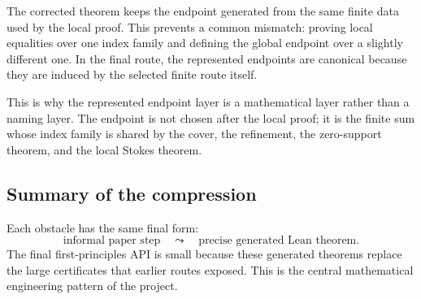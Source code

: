 The corrected theorem keeps the endpoint generated from the same finite data
used by the local proof.  This prevents a common mismatch: proving local
equalities over one index family and defining the global endpoint over a
slightly different one.  In the final route, the represented endpoints are
canonical because they are induced by the selected finite route itself.

This is why the represented endpoint layer is a mathematical layer rather
than a naming layer.  The endpoint is not chosen after the local proof; it is
the finite sum whose index family is shared by the cover, the refinement, the
zero-support theorem, and the local Stokes theorem.

\subsection{Summary of the compression}

Each obstacle has the same final form:
\[
  \text{informal paper step}
  \quad\leadsto\quad
  \text{precise generated Lean theorem}.
\]
The final first-principles API is small because these generated theorems
replace the large certificates that earlier routes exposed.  This is the
central mathematical engineering pattern of the project.
